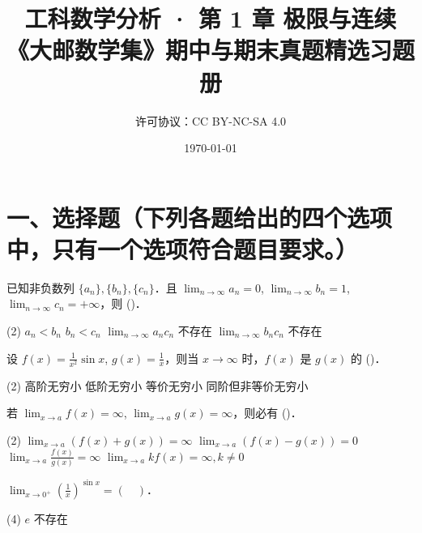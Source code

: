 \documentclass[
  a4paper,
  11pt,
  title in boldface,
  theorem in new line,
  remove problem qed
]{homework}
\title{工科数学分析 · 第 1 章 极限与连续 \\
  \large\normalfont 《大邮数学集》期中与期末真题精选习题册}
\author{\small\normalfont 许可协议：CC BY-NC-SA 4.0}
\date{\today}
\begin{document}
\maketitle
\section*{一、选择题（下列各题给出的四个选项中，只有一个选项符合题目要求。）}

\begin{problem}
  已知非负数列 $\{a_n\}, \{b_n\}, \{c_n\}$．且 $\lim_{n \to \infty} a_n = 0$, $\lim_{n \to \infty} b_n = 1$, $\lim_{n \to \infty} c_n = +\infty$，则 (\quad)．

  \begin{tasks}(2)
  \task $a_n < b_n$
  \task $b_n < c_n$
  \task $\lim_{n \to \infty} a_n c_n$ 不存在
  \task $\lim_{n \to \infty} b_n c_n$ 不存在
\end{tasks}
\end{problem}

\begin{problem}
  设 $f(x) = \frac{1}{x^2} \sin x$, $g(x) = \frac{1}{x}$，则当 $x \to \infty$ 时，$f(x)$ 是 $g(x)$ 的 (\quad)．

  \begin{tasks}(2)
  \task 高阶无穷小
  \task 低阶无穷小
  \task 等价无穷小
  \task 同阶但非等价无穷小
\end{tasks}
\end{problem}

\begin{problem}
  若 $\lim_{x \to a} f(x) = \infty$, $\lim_{x \to a} g(x) = \infty$，则必有 (\quad)．

  \begin{tasks}(2)
  \task $\lim_{x \to a} (f(x) + g(x)) = \infty$
  \task $\lim_{x \to a} (f(x) - g(x)) = 0$
  \task $\lim_{x \to a} \frac{f(x)}{g(x)} = \infty$
  \task $\lim_{x \to a} k f(x) = \infty, k \ne 0$
\end{tasks}
\end{problem}

\begin{problem}
  $\lim_{x \to 0^+} \left(\frac{1}{x}\right)^{\sin x} = (\quad)$．

  \begin{tasks}(4)
  \task $e$
  \task 不存在
\end{tasks}
\end{problem}
\end{document}
